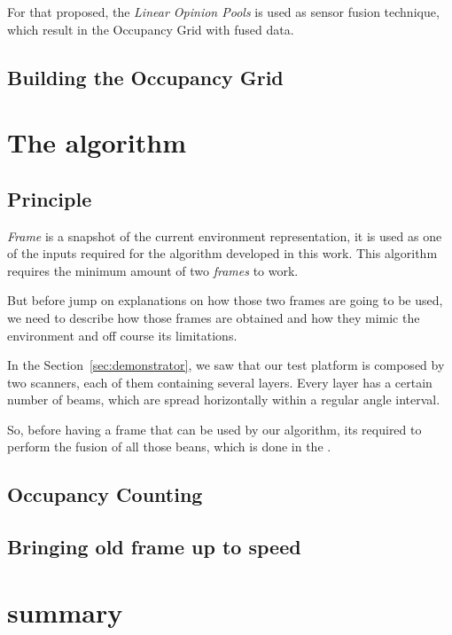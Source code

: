 For that proposed, the \textit{Linear Opinion Pools} is used as sensor fusion technique, which result in the Occupancy Grid with fused data\cite{ADARVE-2012-671211}.

\subsection{Building the Occupancy Grid}



\section{The algorithm}

\subsection{Principle} 

\textit{Frame} is a snapshot of the current environment representation, it is used as one of the inputs required for the algorithm developed in this work. This algorithm requires the minimum amount of two \textit{frames} to work. 

But before jump on explanations on how those two frames are going to be used, we need to describe how those frames are obtained and how they mimic the environment and off course its limitations.

In the Section~\ref{sec:demonstrator}, we saw that our test platform is composed by two scanners, each of them containing several layers. Every layer has a certain number of beams, which are spread horizontally within a regular angle interval. 

So, before having a frame that can be used by our algorithm, its required to perform the fusion of all those beans, which is done in the \textit{}. 

\subsection{Occupancy Counting} 

\subsection{Bringing old frame up to speed}


\section{summary}

